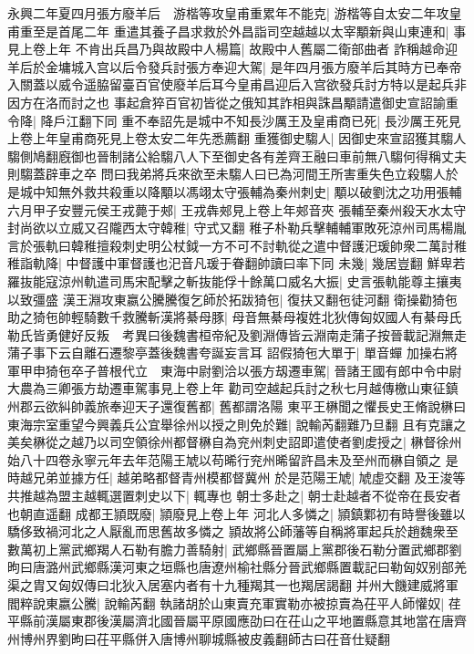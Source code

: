 永興二年夏四月張方廢羊后　游楷等攻皇甫重累年不能克|{
	游楷等自太安二年攻皇甫重至是首尾二年}
重遣其養子昌求救於外昌詣司空越越以太宰顒新與山東連和|{
	事見上卷上年}
不肯出兵昌乃與故殿中人楊篇|{
	故殿中人舊屬二衛部曲者}
詐稱越命迎羊后於金墉城入宫以后令發兵討張方奉迎大駕|{
	是年四月張方廢羊后其時方已奉帝入關蓋以威令遥脇留臺百官使廢羊后耳今皇甫昌迎后入宫欲發兵討方特以是起兵非因方在洛而討之也}
事起倉猝百官初皆從之俄知其詐相與誅昌顒請遣御史宣詔諭重令降|{
	降戶江翻下同}
重不奉詔先是城中不知長沙厲王及皇甫商已死|{
	長沙厲王死見上卷上年皇甫商死見上卷太安二年先悉薦翻}
重獲御史騶人|{
	因御史來宣詔獲其騶人騶側鳩翻廐御也晉制諸公給騶八人下至御史各有差齊王融曰車前無八騶何得稱丈夫則騶蓋辟車之卒}
問曰我弟將兵來欲至未騶人曰已為河間王所害重失色立殺騶人於是城中知無外救共殺重以降顒以馮翊太守張輔為秦州刺史|{
	顒以破劉沈之功用張輔}
六月甲子安豐元侯王戎薨于郟|{
	王戎犇郟見上卷上年郟音夾}
張輔至秦州殺天水太守封尚欲以立威又召隴西太守韓稚|{
	守式又翻}
稚子朴勒兵擊輔輔軍敗死涼州司馬楊胤言於張軌曰韓稚擅殺刺史明公杖鉞一方不可不討軌從之遣中督護汜瑗帥衆二萬討稚稚詣軌降|{
	中督護中軍督護也汜音凡瑗于眷翻帥讀曰率下同}
未幾|{
	幾居豈翻}
鮮卑若羅抜能寇涼州軌遣司馬宋配擊之斬抜能俘十餘萬口威名大振|{
	史言張軌能尊主攘夷以致彊盛}
漢王淵攻東嬴公騰騰復乞師於拓跋猗㐌|{
	復扶又翻㐌徒河翻}
衛操勸猗㐌助之猗㐌帥輕騎數千救騰斬漢將綦母豚|{
	母音無綦母複姓北狄傳匈奴國人有綦母氏勒氏皆勇健好反叛　考異曰後魏書桓帝紀及劉淵傳皆云淵南走蒲子按晉載記淵無走蒲子事下云自離石遷黎亭蓋後魏書夸誕妄言耳}
詔假猗㐌大單于|{
	單音蟬}
加操右將軍甲申猗㐌卒子普根代立　東海中尉劉洽以張方刼遷車駕|{
	晉諸王國有郎中令中尉大農為三卿張方劫遷車駕事見上卷上年}
勸司空越起兵討之秋七月越傳檄山東征鎮州郡云欲糾帥義旅奉迎天子還復舊都|{
	舊都謂洛陽}
東平王楙聞之懼長史王脩說楙曰東海宗室重望今興義兵公宜舉徐州以授之則免於難|{
	說輸芮翻難乃旦翻}
且有克讓之美矣楙從之越乃以司空領徐州都督楙自為兖州刺史詔即遣使者劉䖍授之|{
	楙督徐州始八十四卷永寧元年去年范陽王虓以苟晞行兖州晞留許昌未及至州而楙自領之}
是時越兄弟並據方任|{
	越弟略都督青州模都督冀州}
於是范陽王虓|{
	虓虛交翻}
及王浚等共推越為盟主越輒選置刺史以下|{
	輒專也}
朝士多赴之|{
	朝士赴越者不從帝在長安者也朝直遥翻}
成都王頴既廢|{
	頴廢見上卷上年}
河北人多憐之|{
	頴鎮鄴初有時譽後雖以驕侈致禍河北之人厭亂而思舊故多憐之}
頴故將公師藩等自稱將軍起兵於趙魏衆至數萬初上黨武鄉羯人石勒有膽力善騎射|{
	武鄉縣晉置屬上黨郡後石勒分置武鄉郡劉昫曰唐潞州武鄉縣漢河東之垣縣也唐遼州榆社縣分晉武鄉縣置載記曰勒匈奴别部羌渠之胄又匈奴傳曰北狄入居塞内者有十九種羯其一也羯居謁翻}
并州大饑建威將軍閻粹說東嬴公騰|{
	說輸芮翻}
執諸胡於山東賣充軍實勒亦被掠賣為茌平人師懽奴|{
	荏平縣前漢屬東郡後漢屬濟北國晉屬平原國應劭曰在茌山之平地置縣意其地當在唐齊州博州界劉昫曰茌平縣併入唐博州聊城縣被皮義翻師古曰茌音仕疑翻}
